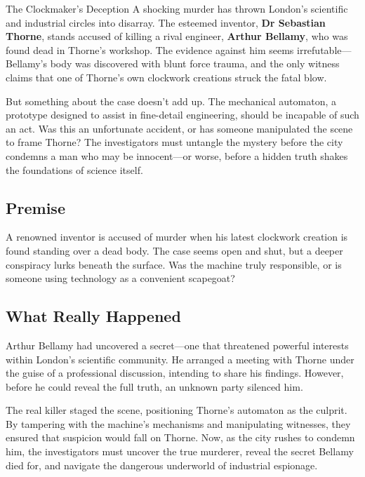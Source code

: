 \begin{WyrdScenarioHeading}{The Clockmaker’s Deception}
    A shocking murder has thrown London’s scientific and industrial circles into disarray. The esteemed inventor, \textbf{Dr Sebastian Thorne}, stands accused of killing a rival engineer, \textbf{Arthur Bellamy}, who was found dead in Thorne’s workshop. The evidence against him seems irrefutable—Bellamy’s body was discovered with blunt force trauma, and the only witness claims that one of Thorne’s own clockwork creations struck the fatal blow.

    But something about the case doesn’t add up. The mechanical automaton, a prototype designed to assist in fine-detail engineering, should be incapable of such an act. Was this an unfortunate accident, or has someone manipulated the scene to frame Thorne? The investigators must untangle the mystery before the city condemns a man who may be innocent—or worse, before a hidden truth shakes the foundations of science itself.

    \subsection*{Premise} 
    A renowned inventor is accused of murder when his latest clockwork creation is found standing over a dead body. The case seems open and shut, but a deeper conspiracy lurks beneath the surface. Was the machine truly responsible, or is someone using technology as a convenient scapegoat?

    \subsection*{What Really Happened} 
    Arthur Bellamy had uncovered a secret—one that threatened powerful interests within London’s scientific community. He arranged a meeting with Thorne under the guise of a professional discussion, intending to share his findings. However, before he could reveal the full truth, an unknown party silenced him.

    The real killer staged the scene, positioning Thorne’s automaton as the culprit. By tampering with the machine’s mechanisms and manipulating witnesses, they ensured that suspicion would fall on Thorne. Now, as the city rushes to condemn him, the investigators must uncover the true murderer, reveal the secret Bellamy died for, and navigate the dangerous underworld of industrial espionage.
\end{WyrdScenarioHeading}

